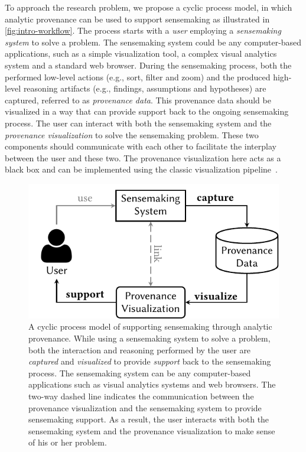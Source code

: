 To approach the research problem, we propose a cyclic process model, in which analytic provenance can be used to support sensemaking as illustrated in \autoref{fig:intro-workflow}. The process starts with a \emph{user} employing a \emph{sensemaking system} to solve a problem. The sensemaking system could be any computer-based applications, such as a simple visualization tool, a complex visual analytics system and a standard web browser. During the sensemaking process, both the performed low-level actions (e.g., sort, filter and zoom) and the produced high-level reasoning artifacts (e.g., findings, assumptions and hypotheses) are captured, referred to as \emph{provenance data}. This provenance data should be visualized in a way that can provide support back to the ongoing sensemaking process. The user can interact with both the sensemaking system and the \emph{provenance visualization} to solve the sensemaking problem. These two components should communicate with each other to facilitate the interplay between the user and these two. The provenance visualization here acts as a black box and can be implemented using the classic visualization pipeline~\cite{Card1999}.

\begin{figure}[h]
	\centering
	\includegraphics{workflow}
	\caption[A cyclic sensemaking-support model through analytic provenance]{A cyclic process model of supporting sensemaking through analytic provenance. While using a sensemaking system to solve a problem, both the interaction and reasoning performed by the user are \emph{captured} and \emph{visualized} to provide \emph{support} back to the sensemaking process. The sensemaking system can be any computer-based applications such as visual analytics systems and web browsers. The two-way dashed line indicates the communication between the provenance visualization and the sensemaking system to provide sensemaking support. As a result, the user interacts with both the sensemaking system and the provenance visualization to make sense of his or her problem.}
	\label{fig:intro-workflow}
\end{figure}

